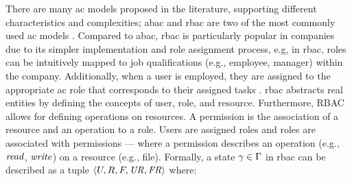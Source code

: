 There are many \gls{ac} models proposed in the literature, supporting different characteristics and complexities; \gls{abac} \cite{horwitz_toward_2002} and \gls{rbac} \cite{sandhu_access_1998} are two of the most commonly used \gls{ac} models \cite{cai_survey_2019}. Compared to \gls{abac}, \gls{rbac} is particularly popular in companies due to its simpler implementation and role assignment process, e.g, in \gls{rbac}, roles can be intuitively mapped to job qualifications (e.g., employee, manager) within the company. 
Additionally, when a user is employed, they are assigned to the appropriate \gls{ac} role that corresponds to their assigned tasks \cite{cai_survey_2019}. \gls{rbac} abstracts real entities by defining the concepts of user, role, and resource. Furthermore, RBAC allows for defining operations on resources. A permission is the association of a resource and an operation to a role.
Users are assigned roles and roles are associated with permissions --- where a permission describes an operation (e.g., \( \mathit{read} \), \( \mathit{write} \)) on a resource (e.g., file). Formally, a state \( \gamma \in \Gamma \) in \gls{rbac} can be described as a tuple \( \langle U, R, F, \mathit{UR}, \mathit{FR} \rangle \) where:
